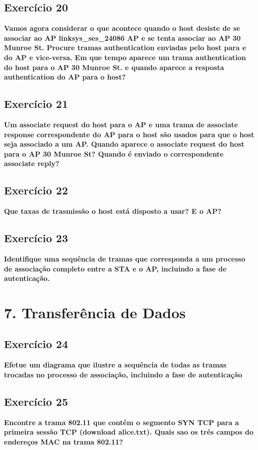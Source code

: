 \documentclass[a4paper]{report}
\begin{document}
\section{Exercício 20}
\textbf{Vamos agora considerar o que acontece quando o host desiste de se
    associar ao AP linksys\_ses\_24086 AP e se tenta associar ao AP 30 Munroe
    St. Procure tramas authentication enviadas pelo host para e do AP e
    vice-versa. Em que tempo aparece um trama authentication do host para o AP
    30 Munroe St. e quando aparece a resposta authentication do AP para o host?}

\section{Exercício 21}
\textbf{Um associate request do host para o AP e uma trama de associate response
    correspondente do AP para o host são usados para que o host seja associado a
    um AP. Quando aparece o associate request do host para o AP 30 Munroe St?
    Quando é enviado o correspondente associate reply?}

\section{Exercício 22}
\textbf{Que taxas de trasmissão o host está disposto a usar? E o AP?}

\section{Exercício 23}
\textbf{Identifique uma sequência de tramas que corresponda a um processo de
    associação completo entre a STA e o AP, incluindo a fase de autenticação.}

\chapter{7. Transferência de Dados}
\section{Exercício 24}
\textbf{Efetue um diagrama que ilustre a sequência de todas as tramas trocadas
    no processo de associação, incluindo a fase de autenticação}

\section{Exercício 25}
\textbf{Encontre a trama 802.11 que contém o segmento SYN TCP para a primeira
    sessão TCP (download alice.txt). Quais sao os três campos do endereços MAC
    na trama 802.11?}
\end{document}
